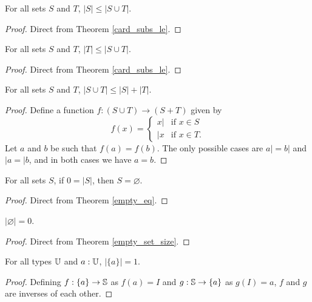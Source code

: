 \documentclass[../../math.tex]{subfiles}
\begin{document}
\begin{theorem} \label{card_union_left}
    For all sets $S$ and $T$, $|S| \leq |S \cup T|$.
\end{theorem}
\begin{proof}
    Direct from Theorem \ref{card_subs_le}.
\end{proof}

\begin{theorem} \label{card_union_right}
    For all sets $S$ and $T$, $|T| \leq |S \cup T|$.
\end{theorem}
\begin{proof}
    Direct from Theorem \ref{card_subs_le}.
\end{proof}

\begin{theorem} \label{card_plus_union}
    For all sets $S$ and $T$, $|S \cup T| \leq |S| + |T|$.
\end{theorem}
\begin{proof}
    Define a function $f : (S \cup T) \to (S + T)$ given by
    \[
        f(x) = \begin{cases}
            x| & \text{if $x \in S$} \\
            |x & \text{if $x \in T$.}
        \end{cases}
    \]
    Let $a$ and $b$ be such that $f(a) = f(b)$.  The only possible cases are $a|
    = b|$ and $|a = |b$, and in both cases we have $a = b$.
\end{proof}

\begin{theorem} \label{zero_is_empty}
    For all sets $S$, if $0 = |S|$, then $S = \varnothing$.
\end{theorem}
\begin{proof}
    Direct from Theorem \ref{empty_eq}.
\end{proof}

\begin{theorem} \label{empty_set_size}
    $|\varnothing| = 0$.
\end{theorem}
\begin{proof}
    Direct from Theorem \ref{empty_set_size}.
\end{proof}

\begin{theorem} \label{singleton_set_size}
    For all types $\U$ and $a : \U$, $|\{a\}| = 1$.
\end{theorem}
\begin{proof}
    Defining $f : \{a\} \to \S$ as $f(a) = I$ and $g : \S \to \{a\}$ as $g(I) =
    a$, $f$ and $g$ are inverses of each other.
\end{proof}
\end{document}
